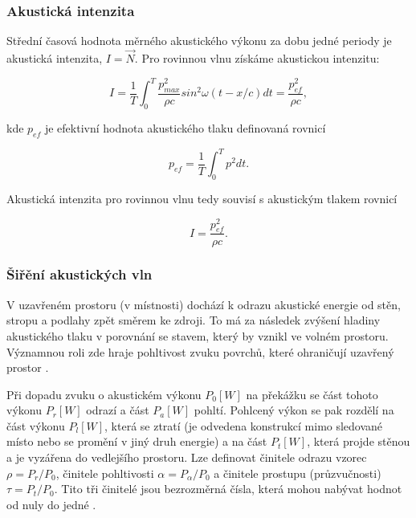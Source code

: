 \subsubsection{Akustická intenzita}

Střední časová hodnota měrného akustického výkonu za dobu jedné periody je akustická intenzita, $I = \overrightarrow{N}$. Pro rovinnou vlnu získáme akustickou intenzitu: 

\begin{equation}
I = \frac{1}{T}\int_0^T\frac{p^2_{max}}{\rho c}sin^2\omega(t - x/c)dt = \frac{p^2_{ef}}{\rho c},
\end{equation}

kde $p_{ef}$ je efektivní hodnota akustického tlaku definovaná rovnicí

\begin{equation}
p_{ef} = \frac{1}{T}\int_0^Tp^2dt.
\end{equation}

Akustická intenzita pro rovinnou vlnu tedy souvisí s akustickým tlakem rovnicí~\cite{12} 

\begin{equation}
I = \frac{p^2_{ef}}{\rho c}.
\end{equation}

\subsubsection{Šiřění akustických vln} 

V uzavřeném prostoru (v místnosti) dochází k odrazu akustické energie od stěn, stropu a podlahy zpět směrem ke zdroji. To má za následek zvýšení hladiny akustického tlaku v porovnání se stavem, který by vznikl ve volném prostoru. Významnou roli zde hraje pohltivost zvuku povrchů, které ohraničují uzavřený prostor \cite{13}.

Při dopadu zvuku o akustickém výkonu $P_0[W]$ na překážku se část tohoto výkonu $P_r[W]$ odrazí a část $P_a[W]$ pohltí. Pohlcený výkon se pak rozdělí na část výkonu $P_l[W]$, která se ztratí (je odvedena konstrukcí mimo sledované místo nebo se promění v jiný druh energie) a na část $P_t[W]$, která projde stěnou a je vyzářena do vedlejšího prostoru. Lze definovat činitele odrazu vzorec $\rho = P_r/P_0$, činitele pohltivosti $\alpha = P_\alpha/P_0$ a činitele prostupu (průzvučnosti) $\tau = P_t/P_0$. Tito tři činitelé jsou bezrozměrná čísla, která mohou nabývat hodnot od nuly do jedné \cite{13}.

